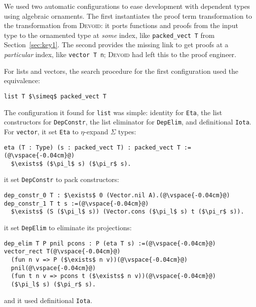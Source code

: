 We used two automatic configurations to ease development with dependent types using algebraic ornaments.
The first instantiates the proof term transformation to the transformation from \textsc{Devoid}:
it ports functions and proofs from the input type to the ornamented type at \textit{some} index,
like \lstinline{packed_vect T} from Section~\ref{sec:key1}.
The second provides the missing link to get proofs at a \textit{particular} index, like \lstinline{vector T n};
\textsc{Devoid} had left this to the proof engineer.

For lists and vectors, the search procedure for the first configuration used the equivalence:

\begin{lstlisting}
list T $\simeq$ packed_vect T
\end{lstlisting}
The configuration it found for \lstinline{list} was simple: identity for \lstinline{Eta},
the list constructors for \lstinline{DepConstr}, the list eliminator for \lstinline{DepElim},
and definitional \lstinline{Iota}.
For \lstinline{vector}, it set \lstinline{Eta} to $\eta$-expand $\Sigma$ types:

\begin{lstlisting}[backgroundcolor=\color{cyan!30}]
eta (T : Type) (s : packed_vect T) : packed_vect T :=(@\vspace{-0.04cm}@)
  $\exists$ ($\pi_l$ s) ($\pi_r$ s).
\end{lstlisting}
it set \lstinline{DepConstr} to pack constructors: %

\begin{lstlisting}[backgroundcolor=\color{cyan!30}]
dep_constr_0 T : $\exists$ 0 (Vector.nil A).(@\vspace{-0.04cm}@)
dep_constr_1 T t s :=(@\vspace{-0.04cm}@)
  $\exists$ (S ($\pi_l$ s)) (Vector.cons ($\pi_l$ s) t ($\pi_r$ s)).
\end{lstlisting}
it set \lstinline{DepElim} to eliminate its projections:

\begin{lstlisting}[backgroundcolor=\color{cyan!30}]
dep_elim T P pnil pcons : P (eta T s) :=(@\vspace{-0.04cm}@)
vector_rect T(@\vspace{-0.04cm}@)
  (fun n v => P ($\exists$ n v))(@\vspace{-0.04cm}@)
  pnil(@\vspace{-0.04cm}@)
  (fun t n v => pcons t ($\exists$ n v))(@\vspace{-0.04cm}@)
  ($\pi_l$ s) ($\pi_r$ s).
\end{lstlisting}
and it used definitional \lstinline{Iota}.

